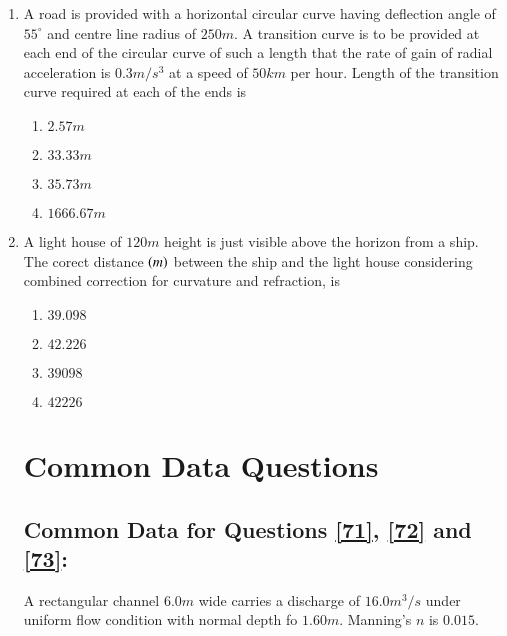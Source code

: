 \documentclass[journal]{IEEEtran}
\begin{document}
\begin{enumerate}
    \item A road is provided with a horizontal circular curve having deflection angle of  $55^{\circ}$ and centre line radius of $250 m$. A transition curve is to be provided at each end of the circular curve of such a length that the rate of gain of radial acceleration is $0.3 m/s^3$ at a speed of $50 km$ per hour. Length of the transition curve required at each of the ends is
        \begin{enumerate}
            \item $2.57m$
            \item $33.33m$
            \item $35.73m$
            \item $1666.67m$
        \end{enumerate}

    \item A light house of $120 m$ height is just visible above the horizon from a ship. The corect distance $\left(m\right)$ between the ship and the light house considering combined correction for curvature and refraction, is
        \begin{enumerate}
            \item $39.098$
            \item $42.226$
            \item $39098$
            \item $42226$
        \end{enumerate}

        \section*{Common Data Questions}
            \subsection*{Common Data for Questions \ref{71}, \ref{72} and \ref{73}:}
             
            A rectangular channel $6.0 m$ wide carries a discharge of $16.0 m^3 / s$ under uniform flow condition with normal depth fo $1.60 m$. Manning's $n$ is $0.015$.


\end{enumerate}
\end{document}
